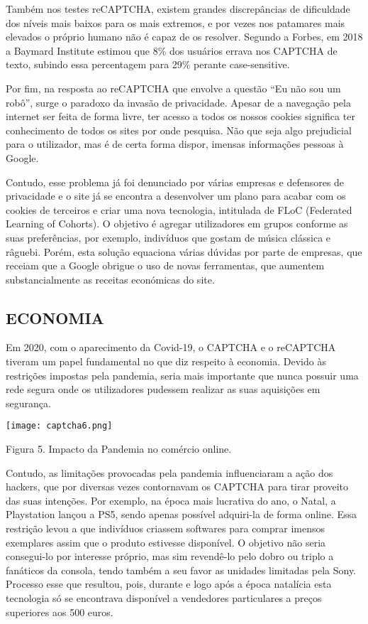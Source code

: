 \documentclass{article}
\begin{document}
 		 
	Também nos testes reCAPTCHA, existem grandes discrepâncias de dificuldade dos níveis mais baixos para os mais extremos, e por vezes nos patamares mais elevados o próprio humano não é capaz de os resolver. Segundo a Forbes, em 2018 a Baymard Institute estimou que 8\% dos usuários errava nos CAPTCHA de texto, subindo essa percentagem para 29\% perante case-sensitive\cite{12}. 

	Por fim, na resposta ao reCAPTCHA que envolve a questão “Eu não sou um robô”, surge o paradoxo da invasão de privacidade. Apesar de a navegação pela internet ser feita de forma livre, ter acesso a todos os nossos cookies significa ter conhecimento de todos os sites por onde pesquisa. Não que seja algo prejudicial para o utilizador, mas é de certa forma dispor, imensas informações pessoas à Google.
	
	Contudo, esse problema já foi denunciado por várias empresas e defensores de privacidade e o site já se encontra a desenvolver um plano para acabar com os cookies de terceiros e criar uma nova tecnologia, intitulada de FLoC (Federated Learning of Cohorts). O objetivo é agregar utilizadores em grupos conforme as suas preferências, por exemplo, indivíduos que gostam de música clássica e râguebi\cite{13}. 
    Porém, esta solução equaciona várias dúvidas por parte de empresas, que receiam que a Google obrigue o uso de novas ferramentas, que aumentem substancialmente as receitas económicas do site. 

	
\subsection{ECONOMIA}
Em 2020, com o aparecimento da Covid-19, o CAPTCHA e o reCAPTCHA tiveram um papel fundamental no que diz respeito à economia. Devido às restrições impostas pela pandemia, seria mais importante que nunca possuir uma rede segura onde os utilizadores pudessem realizar as suas aquisições em segurança\cite{9}.

\begin{center}
   \texttt{[image: captcha6.png]}
   \newline
    \caption{Figura 5. Impacto da Pandemia no comércio online\cite{9}.}
    \label{fig:my_label}    
\end{center}

Contudo, as limitações provocadas pela pandemia influenciaram a ação dos hackers, que por diversas vezes contornavam os CAPTCHA para tirar proveito das suas intenções. Por exemplo, na época mais lucrativa do ano, o Natal, a Playstation lançou a PS5, sendo apenas possível adquiri-la de forma online. Essa restrição levou a que indivíduos criassem softwares para comprar imensos exemplares assim que o produto estivesse disponível. O objetivo não seria consegui-lo por interesse próprio, mas sim revendê-lo pelo dobro ou triplo a fanáticos da consola, tendo também a seu favor as unidades limitadas pela Sony. Processo esse que resultou, pois, durante e logo após a época natalícia esta tecnologia só se encontrava disponível a vendedores particulares a preços superiores aos 500 euros\cite{8}. 
\end{document}
